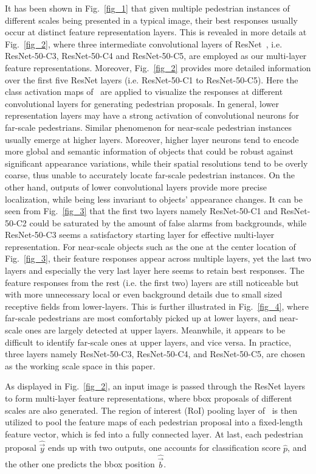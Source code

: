 \documentclass[10pt,journal,compsoc,twoside]{IEEEtran}
\begin{document}
It has been shown in Fig.~\ref{fig_1} that given multiple pedestrian instances of different scales being presented in a typical image, their best responses usually occur at distinct feature representation layers. This is revealed in more details at Fig.~\ref{fig_2}, where three intermediate convolutional layers of ResNet~\cite{HeEtAl:cvpr16}, i.e. ResNet-50-C3, ResNet-50-C4 and ResNet-50-C5, are employed as our multi-layer feature representations.
Moreover, Fig.~\ref{fig_2} provides more detailed information over the first five ResNet layers (i.e. ResNet-50-C1 to ResNet-50-C5).
Here the class activation maps of~\cite{ZhouAl:cvpr16} are applied to visualize the responses at different convolutional layers for generating pedestrian proposals.
In general, lower representation layers may have a strong activation of convolutional neurons for far-scale pedestrians. Similar phenomenon for near-scale pedestrian instances usually emerge at higher layers.
Moreover, higher layer neurons tend to encode more global and semantic information of objects that could be robust against significant appearance variations, while their spatial resolutions tend to be overly coarse, thus unable to accurately locate far-scale pedestrian instances. On the other hand, outputs of lower convolutional layers provide more precise localization, while being less invariant to objects' appearance changes.
It can be seen from Fig.~\ref{fig_3} that the first two layers namely ResNet-50-C1 and ResNet-50-C2 could be saturated by the amount of false alarms from backgrounds, while ResNet-50-C3 seems a satisfactory starting layer for effective multi-layer representation.
For near-scale objects such as the one at the center location of Fig.~\ref{fig_3}, their feature responses appear across multiple layers, yet the last two layers and especially the very last layer here seems to retain best responses. The feature responses from the rest (i.e. the first two) layers are still noticeable but with more unnecessary local or even background details due to small sized receptive fields from lower-layers. This is further illustrated in Fig.~\ref{fig_4}, where far-scale pedestrians are most comfortably picked up at lower layers, and near-scale ones are largely detected at upper layers. Meanwhile, it appears to be difficult to identify far-scale ones at upper layers, and vice versa.
In practice, three layers namely ResNet-50-C3, ResNet-50-C4, and ResNet-50-C5, are chosen as the working scale space in this paper.



As displayed in Fig.~\ref{fig_2}, an input image is passed through the ResNet layers to form multi-layer feature representations,
where bbox proposals of different scales are also generated.
The region of interest (RoI) pooling layer of~\cite{YanChoLin:cvpr16} is then utilized to pool the feature maps of each pedestrian proposal into a fixed-length feature vector,
which is fed into a fully connected layer.
At last, each pedestrian proposal $\hat{\vec{y}}$ ends up with two outputs, one accounts for classification score $\hat{p}$, and the other one predicts the bbox position $\hat{\vec{b}}$.
\end{document}
